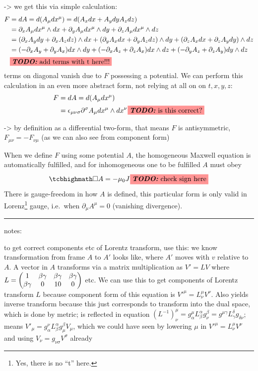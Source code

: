 \documentclass[../relativity_main.tex]{subfiles}
\begin{document}
-> we get this via simple calculation:
\begin{align*}
	F &= dA
	= d (A_\mu dx^\mu)
	= d (A_x dx + A_y dy A_z dz)
	\\
	&= \partial_x A_\mu dx^\mu \wedge dx + \partial_y A_\mu dx^\mu \wedge dy + \partial_z A_\mu dx^\mu \wedge dz
	\\
	&= (\partial_x A_y dy + \partial_x A_z dz) \wedge dx + (\partial_y A_x dx + \partial_y A_z dz) \wedge dy + (\partial_z A_x dx + \partial_z A_y dy) \wedge dz
	\\
	&= (- \partial_x A_y + \partial_y A_x) dx \wedge dy + (- \partial_x A_z + \partial_z A_x) dx \wedge dz + (- \partial_y A_z + \partial_z A_y) dy \wedge dz
	\\
	&\todo{add terms with t here!!!}
\end{align*}
terms on diagonal vanish due to $F$ possessing a potential. We can perform this calculation in an even more abstract form, not relying at all on on $t, x, y, z$:
\begin{align*}
	F &= dA
	= d (A_\mu dx^\mu)
	\\
	&= \epsilon_{\mu \nu \sigma} \partial^\sigma A_\mu dx^\mu \wedge dx^\nu
	\todo{is this correct?}
\end{align*}

-> by definition as a differential two-form, that means $F$ is antisymmetric, $F_{\mu \nu} = - F_{\nu \mu}$ (as we can also see from component form)

When we define $F$ using some potential $A$, the homogeneous Maxwell equation is automatically fulfilled, and for inhomogeneous one to be fulfilled $A$ must obey
\begin{equation}
	\eqbox{
		\square A = - \mu_0 J
	}
	\todo{check sign here}
\end{equation}
There is gauge-freedom in how $A$ is defined, this particular form is only valid in Lorenz\footnote{Yes, there is no \enquote{t} here.} gauge, i.e.~when $\partial_\mu A^\mu = 0$ (vanishing divergence).



\hrule

notes:

to get correct components etc of Lorentz transform, use this: we know transformation from frame $A$ to $A'$ looks like, where $A'$ moves with $v$ relative to $A$. A vector in $A$ transforms via a matrix multiplication as $V' = L V$ where $L = \mqty(1 & \beta \gamma & \beta \gamma & \beta \gamma \\ \beta \gamma & 0 & 1 0 & 0)$ etc. We can use this to get components of Lorentz transform $L$ because component form of this equation is $V'^\mu = L^\mu_\nu V^\nu$. Also yields inverse transform because this just corresponds to transform into the dual space, which is done by metric; is reflected in equation $(L^{-1})^\mu_\nu = g^\mu_\alpha L^\alpha_\beta g^\beta_\nu = g^{\mu \gamma} L^\delta_\gamma g_{\delta \nu}$; means $V'_\mu = g^\nu_\alpha L^\alpha_\beta g^\beta_\mu V_\mu$, which we could have seen by lowering $\mu$ in $V'^\mu = L^\mu_\nu V^\nu$ and using $V_\nu = g_{\nu \sigma} V^\sigma$ already
\end{document}

